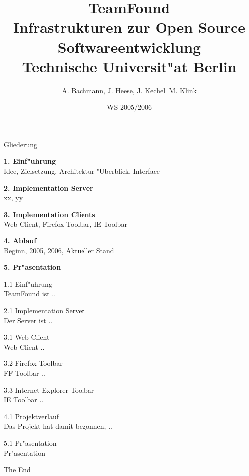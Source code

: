 \documentclass[landscape]{slides}
\begin{document}
%
\title{TeamFound\\Infrastrukturen zur Open Source Softwareentwicklung\\Technische Universit"at Berlin}
\author{A. Bachmann, J. Heese, J. Kechel, M. Klink}
\date{WS 2005/2006}

%
\maketitle%
%
\begin{slide}{Gliederung}

\textbf{1. Einf"uhrung}\\
Idee, Zielsetzung, Architektur-"Uberblick, Interface

\textbf{2. Implementation Server}\\
xx, yy

\textbf{3. Implementation Clients}\\
Web-Client, Firefox Toolbar, IE Toolbar

\textbf{4. Ablauf}\\
Beginn, 2005, 2006, Aktueller Stand

\textbf{5. Pr"asentation}
\end{slide}
%
%
%
%
\begin{slide}{1.1 Einf"uhrung}\\
TeamFound ist ..
\end{slide}
%
%
%
\begin{slide}{2.1 Implementation Server}\\
Der Server ist ..
\end{slide}
%
%
%
\begin{slide}{3.1 Web-Client}\\

Web-Client ..

\end{slide}
%
\begin{slide}{3.2 Firefox Toolbar}\\
FF-Toolbar ..
\end{slide}
%
%
%
\begin{slide}{3.3 Internet Explorer Toolbar}\\
IE Toolbar ..
\end{slide}
%
\begin{slide}{4.1 Projektverlauf}\\
Das Projekt hat damit begonnen, ..
\end{slide}
%
%
%
\begin{slide}{5.1 Pr"asentation}\\
Pr"asentation
\end{slide}
%
%
%
%
\begin{slide}{}
The End
\end{slide}
\end{document}
